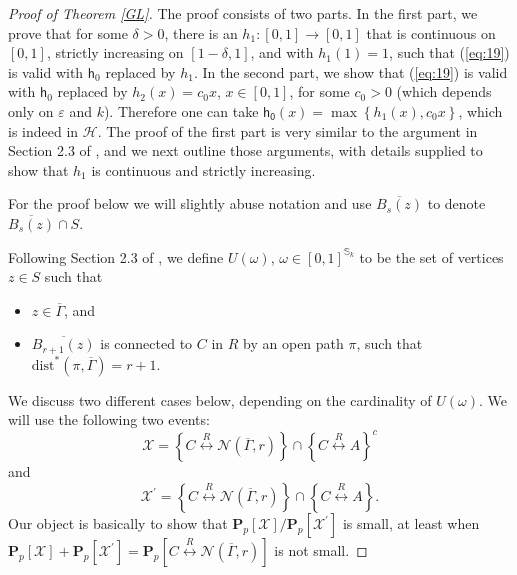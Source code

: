 \documentclass[12pt, twoside,a4paper,reqno]{amsart}
\theoremstyle{plain}
\theoremstyle{remark}
\theoremstyle{definition}
\newcommand{\eps}{\varepsilon}
\newcommand{\PP}{\mathbf{P}}
\newcommand{\Pp}[1]{\PP_p \left [ #1 \right ]}
\newcommand{\lr}[1][]{\overset{\:#1\:}\longleftrightarrow}
\newcommand{\ol}{\overline}
\renewcommand{\bar}{\overline}
\begin{document}
\begin{proof} [Proof of Theorem \ref{GL}] The proof consists of two parts. In
  the first part, we prove that for some $\delta >0 $, there is an
  $h_{1}:\left[0 ,1\right] \rightarrow [0,1]$ that is continuous on $[0,1]$,
  strictly increasing on $[1-\delta,1]$, and with $h_{1}\left( 1\right) =1$, such
  that (\ref{eq:19}) is valid with $\mathsf{h}_0$ replaced by $h_{1}$. In the
  second part, we show that (\ref{eq:19}) is valid with $\mathsf{h}_0$ replaced
  by $h_{2}\left( x\right) =c_{0}x$, $x\in \left[ 0,1\right] $, for some
  $c_{0}>0$ (which depends only on $\eps$ and $k$). Therefore one can take
  $\mathsf{h_{0}}\left( x\right) =\max \left\{ h_{1}\left( x\right)
    ,c_{0}x\right\} $, which is indeed in $\mathcal{H}.$ The proof of the
  first part is very similar to the argument in Section 2.3 of \cite{DST}, and
  we next outline those arguments, with details supplied to show that $h_{1}$ is
  continuous and strictly increasing.

  For the proof below we will slightly abuse notation and use
  $\ol{B_{s}(z)}$ to denote $\ol{B_{s}(z)} \cap S$.

  Following Section 2.3 of \cite{DST}, we define $U(\omega)$, $%
  \omega \in \left[ 0,1\right] ^{\mathbb{S}_{k}}$ to be the set of vertices $z
  \in S$ such that

\begin{itemize}
\item $z \in \bar \Gamma$, and
\item $\overline{B_{r+1}\left( z\right) }$ is connected to $C$ in $R$
by an open path $\pi $, such that $\mathrm{dist}^{*}(\pi, \bar \Gamma)= r+1$.
\end{itemize}

We discuss two different cases below, depending on the cardinality of $U(\omega)$. We will use the following two events:
\begin{equation*}
\mathcal{X}=\left\{ C\lr[R] \mathcal{N}(\bar \Gamma, r)\right\} \cap \left\{ C\lr[R] A \right\} ^{c}
\end{equation*}%
and
\begin{equation*}
\mathcal{X}^{\prime }=\left\{ C\lr[R] \mathcal{N}(\bar \Gamma, r)\right\} \cap \left\{ C\lr[R]A \right\} .
\end{equation*}
Our object is basically to show that $\Pp{\mathcal{X}}/\Pp{\mathcal{X}^{\prime}}$ is small, at least when $\Pp{\mathcal{X}}+ \Pp{\mathcal{X}^{\prime}} = \Pp{C\lr[R] \mathcal{N}(\bar \Gamma, r)}$ is not small.


\end{proof}
\end{document}

